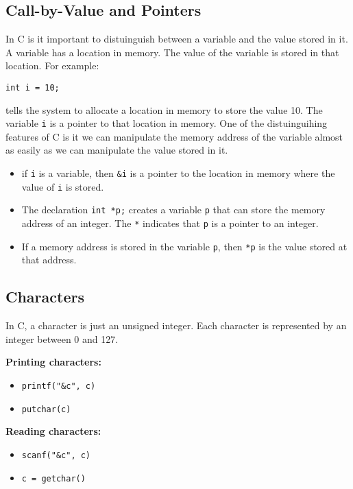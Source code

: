 \documentclass[a4paper, 10pt]{article}
\begin{document}
\subsection{Call-by-Value and Pointers}
In C is it important to distuinguish between a variable and the value stored in it. A variable has a location in memory. The value of the variable is stored in that location. For example:
\begin{lstlisting}[style=cStyle]
int i = 10;
\end{lstlisting}
tells the system to allocate a location in memory to store the value 10. The variable \texttt{i} is a pointer to that location in memory. One of the distuinguihing features of C is it we can manipulate the memory address of the variable almost as easily as we can manipulate the value stored in it.
\begin{conceptbox}[Pointers]
    \begin{itemize}
        \item if \texttt{i} is a variable, then \texttt{\&i} is a pointer to the location in memory where the value of \texttt{i} is stored.
        \item The declaration \texttt{int *p;} creates a variable \texttt{p} that can store the memory address of an integer. The \texttt{*} indicates that \texttt{p} is a pointer to an integer.
        \item If a memory address is stored in the variable \texttt{p}, then \texttt{*p} is the value stored at that address.
    \end{itemize}
\end{conceptbox}
\pagebreak
\subsection{Characters}
\begin{conceptbox}
    In C, a character is just an unsigned integer. Each character is represented by an integer between 0 and 127.
\end{conceptbox}

\begin{minipage}{0.45\textwidth}
    \textbf{Printing characters:}

    \begin{itemize}
        \item \texttt{printf("\&c", c)}
        \item \texttt{putchar(c)}
    \end{itemize}
\end{minipage}
\begin{minipage}{0.45\textwidth}
    \textbf{Reading characters:}
    \begin{itemize}
        \item \texttt{scanf("\&c", c)}
        \item \texttt{c = getchar()}
    \end{itemize}
\end{minipage}
\end{document}
